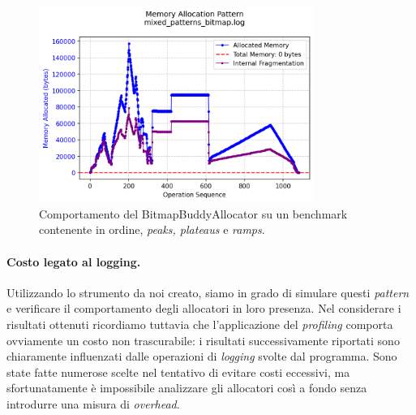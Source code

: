 \begin{figure}[H]
  \centering
  \includegraphics[width=0.8\textwidth]{graphs/mixed_patterns_bitmap.png}
  \caption{Comportamento del BitmapBuddyAllocator su un benchmark contenente in ordine, \textit{peaks, plateaus} e \textit{ramps}.}
  \label{fig:mixed_patterns_bitmap}
\end{figure}


\paragraph{Costo legato al logging.}
Utilizzando lo strumento da noi creato, siamo in grado di simulare questi \textit{pattern} e verificare il comportamento degli allocatori in loro presenza. Nel considerare i risultati ottenuti ricordiamo tuttavia che l'applicazione del \textit{profiling} comporta ovviamente un costo non trascurabile: i risultati successivamente riportati sono chiaramente influenzati dalle operazioni di \textit{logging} svolte dal programma. Sono state fatte numerose scelte nel tentativo di evitare costi eccessivi, ma sfortunatamente è impossibile analizzare gli allocatori così a fondo senza introdurre una misura di \textit{overhead}.


